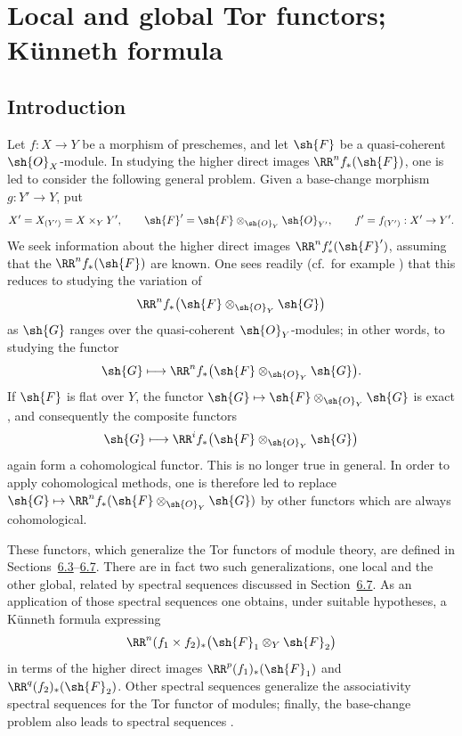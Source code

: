 \section{Local and global Tor functors; K\"unneth formula}
\label{section:III.6}


\subsection{Introduction}
\label{subsection:III.6.1}


\begin{env}[6.1.1]
\label{III.6.1.1}
Let $f:X\to Y$ be a morphism of preschemes, and let $\sh{F}$ be
a quasi-coherent $\sh{O}_X$-module.  In studying the higher direct
images $\RR^n f_*(\sh{F})$, one is led to consider the following
general problem.  Given a base-change morphism $g:Y'\to Y$, put
\[
  X'=X_{(Y')}=X\times_Y Y',\qquad
  \sh{F}'=\sh{F}\otimes_{\sh{O}_Y}\sh{O}_{Y'},\qquad
  f'=f_{(Y')}:X'\to Y'.
\]
We seek information about the higher direct images
$\RR^n f'_*(\sh{F}')$, assuming that the
$\RR^n f_*(\sh{F})$ are known.  One sees readily
(cf.\ for example ) that this reduces to studying
the variation of
\[
  \RR^n f_*\bigl(\sh{F}\otimes_{\sh{O}_Y}\sh{G}\bigr)
\]
as $\sh{G}$ ranges over the quasi-coherent $\sh{O}_Y$-modules;
in other words, to studying the functor
\[
  \sh{G}\longmapsto
  \RR^n f_*\bigl(\sh{F}\otimes_{\sh{O}_Y}\sh{G}\bigr).
\]
If $\sh{F}$ is flat over $Y$, the functor
$\sh{G}\mapsto\sh{F}\otimes_{\sh{O}_Y}\sh{G}$ is exact
, and consequently the composite functors
\[
  \sh{G}\longmapsto
  \RR^i f_*\bigl(\sh{F}\otimes_{\sh{O}_Y}\sh{G}\bigr)
\]
again form a cohomological functor.  This is no longer true in
general.  In order to apply cohomological methods, one is therefore
led to replace
$\sh{G}\mapsto
\RR^n f_*(\sh{F}\otimes_{\sh{O}_Y}\sh{G})$
by other functors which are always cohomological.

These functors, which generalize the Tor functors of module theory,
are defined in Sections~\hyperref[subsection:III.6.3]{6.3}--\hyperref[subsection:III.6.7]{6.7}.  There are in fact two such
generalizations, one local and the other global, related by spectral
sequences discussed in Section~\hyperref[subsection:III.6.7]{6.7}.  As an application of those
spectral sequences one obtains, under suitable hypotheses, a
K\"unneth formula expressing
\[
  \RR^n(f_1\times f_2)_*
  \bigl(\sh{F}_1\otimes_Y\sh{F}_2\bigr)
\]
in terms of the higher direct images
$\RR^p(f_1)_*(\sh{F}_1)$ and
$\RR^q(f_2)_*(\sh{F}_2)$.  Other spectral sequences
 generalize the associativity spectral sequences for
the Tor functor of modules; finally, the base-change problem also
leads to spectral sequences .
\end{env}


